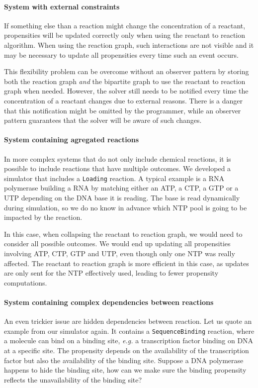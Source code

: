 \paragraph{System with external constraints} If something else than a reaction might change the concentration of a reactant, propensities will be updated correctly only when using the reactant to reaction algorithm. When using the reaction graph, such interactions are not visible and it may be necessary to update all propensities every time such an event occurs.

This flexibility problem can be overcome without an observer pattern by storing both the reaction graph \emph{and} the bipartite graph to use the reactant to reaction graph when needed. However, the solver still needs to be notified every time the concentration of a reactant changes due to external reasons. There is a danger that this notification might be omitted by the programmer, while an observer pattern guarantees that the solver will be aware of such changes.

\paragraph{System containing agregated reactions} In more complex systems that do not only include chemical reactions, it is possible to include reactions that have multiple outcomes. We developed a simulator that includes a \texttt{Loading} reaction. A typical example is a RNA polymerase building a RNA by matching either an ATP, a CTP, a GTP or a UTP depending on the DNA base it is reading. The base is read dynamically during simulation, so we do no know in advance which NTP pool is going to be impacted by the reaction. 

In this case, when collapsing the reactant to reaction graph, we would need to consider all possible outcomes. We would end up updating all propensities involving ATP, CTP, GTP and UTP, even though only one NTP was really affected. The reactant to reaction graph is more efficient in this case, as updates are only sent for the NTP effectively used, leading to fewer propensity computations.

\paragraph{System containing complex dependencies between reactions} An even trickier issue are hidden dependencies between reaction. Let us quote an example from our simulator again. It contains a \texttt{SequenceBinding} reaction, where a molecule can bind on a binding site, \textit{e.g.} a transcription factor binding on DNA at a specific site. The propensity depends on the availability of the transcription factor but also the availability of the binding site. Suppose a DNA polymerase happens to hide the binding site, how can we make sure the binding propensity reflects the unavailability of the binding site?

